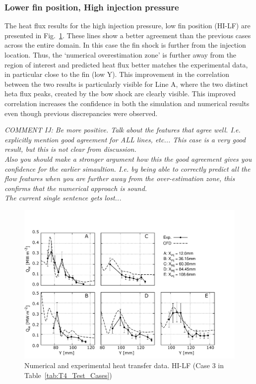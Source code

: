 \documentclass{AIAA}
\begin{document}
\subsubsection{Lower fin position, High injection pressure}

The heat flux results for the high injection pressure, low fin position (HI-LF) are presented in Fig.~\ref{fig:HeatFluxLPHILF}.
These lines show a better agreement than the previous cases across the entire domain.
In this case the fin shock is further from the injection location. 
Thus, the `numerical overestimation zone' is further away from the region of interest and predicted heat flux better matches the experimental data, in particular close to the fin (low Y). 
This improvement in the correlation between the two results is particularly visible for Line A, where the two distinct heta flux peaks, created by the bow shock are clearly visible.
This improved correlation increases the confidence in both the simulation and numerical results even though previous discrepancies were observed. 

{\it COMMENT IJ: Be more positive. Talk about the features that agree well. I.e. explicitly mention good agreement for ALL lines, etc... This case is a very good result, but this is not clear from discussion.\\
Also you should make a stronger argument how this the good agreement gives you confidence for the earlier simaultion. I.e. by being able to correctly predict all the flow features when you are further away from the over-estimation zone, this confirms that the numerical approach is sound.\\
The current single sentence gets lost...}


%
\begin{figure}[!h]
\center
\includegraphics[trim = 0mm 3mm 25mm 25mm, clip, width=0.60\columnwidth,valign=t,fbox]{Figures/Data/LP_HI_LF/GNUP_CFD_GaugesLines_Multi.pdf}
\caption{Numerical and experimental heat transfer data. HI-LF (Case 3 in Table~\ref{tab:T4_Test_Cases})}
\label{fig:HeatFluxLPHILF}
\end{figure} 
\end{document}
